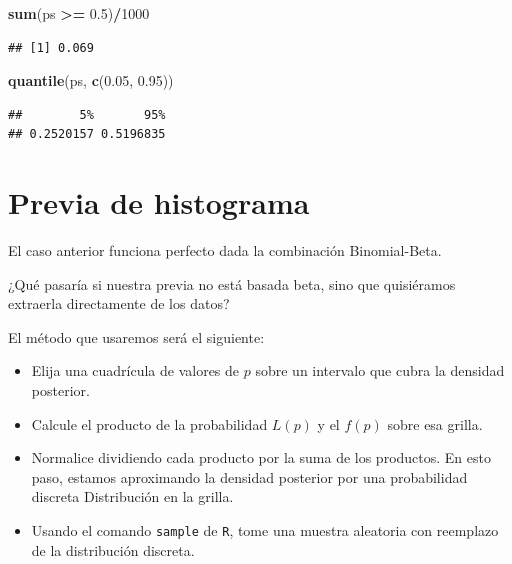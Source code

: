 \documentclass[
  12pt,
]{book}
\newenvironment{Shaded}{\begin{snugshade}}{\end{snugshade}}
\newcommand{\DecValTok}[1]{\textcolor[rgb]{0.00,0.00,0.81}{#1}}
\newcommand{\FloatTok}[1]{\textcolor[rgb]{0.00,0.00,0.81}{#1}}
\newcommand{\KeywordTok}[1]{\textcolor[rgb]{0.13,0.29,0.53}{\textbf{#1}}}
\newcommand{\NormalTok}[1]{#1}
\newcommand{\OperatorTok}[1]{\textcolor[rgb]{0.81,0.36,0.00}{\textbf{#1}}}
\newcommand{\StringTok}[1]{\textcolor[rgb]{0.31,0.60,0.02}{#1}}
\providecommand{\tightlist}{%
  \setlength{\itemsep}{0pt}\setlength{\parskip}{0pt}}
\theoremstyle{definition}
\theoremstyle{definition}
\theoremstyle{definition}
\theoremstyle{remark}
\begin{document}
\begin{Shaded}
\begin{Highlighting}[]
\KeywordTok{sum}\NormalTok{(ps }\OperatorTok{>=}\StringTok{ }\FloatTok{0.5}\NormalTok{)}\OperatorTok{/}\DecValTok{1000}
\end{Highlighting}
\end{Shaded}

\begin{verbatim}
## [1] 0.069
\end{verbatim}

\begin{Shaded}
\begin{Highlighting}[]
\KeywordTok{quantile}\NormalTok{(ps, }\KeywordTok{c}\NormalTok{(}\FloatTok{0.05}\NormalTok{, }\FloatTok{0.95}\NormalTok{))}
\end{Highlighting}
\end{Shaded}

\begin{verbatim}
##        5%       95% 
## 0.2520157 0.5196835
\end{verbatim}

\hypertarget{previa-de-histograma}{%
\section{Previa de histograma}\label{previa-de-histograma}}

El caso anterior funciona perfecto dada la combinación Binomial-Beta.

¿Qué pasaría si nuestra previa no está basada beta, sino que
quisiéramos extraerla directamente de los datos?

El método que usaremos será el siguiente:

\begin{itemize}
\tightlist
\item
  Elija una cuadrícula de valores de \(p\) sobre un intervalo que cubra
  la densidad posterior.
\item
  Calcule el producto de la probabilidad \(L (p)\) y el \(f (p)\) sobre
  esa grilla.
\item
  Normalice dividiendo cada producto por la suma de los productos. En
  esto paso, estamos aproximando la densidad posterior por una
  probabilidad discreta Distribución en la grilla.
\item
  Usando el comando \texttt{sample} de \texttt{R}, tome una muestra aleatoria con
  reemplazo de la distribución discreta.
\end{itemize}
\end{document}
